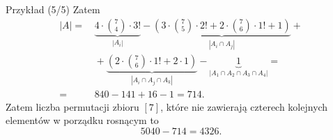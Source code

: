 \documentclass[a4paper,10pt]{beamer}
\begin{document}
\begin{frame}

\begin{exampleblock}{Przykład (5/5)}
Zatem
\begin{align*}
|A|=&\,\underbrace{4\cdot{7\choose4}\cdot3!}_{|A_i|}-\underbrace{\left(3\cdot{7\choose5}\cdot2!+2\cdot{7\choose6}\cdot1!+1\right)}_{|A_i\cap A_j|}+\\
&\,+\underbrace{\left(2\cdot{7\choose6}\cdot1!+2\cdot1\right)}_{|A_i\cap A_j\cap A_k|}-\underbrace{1}_{|A_1\cap A_2\cap A_3\cap A_4|}=\\
=&\,840-141+16-1=714.
\end{align*}
Zatem liczba permutacji zbioru $[7]$, które nie zawierają czterech kolejnych elementów w porządku rosnącym to $$5040-714=4326.$$
\end{exampleblock}

\end{frame}
\end{document}
